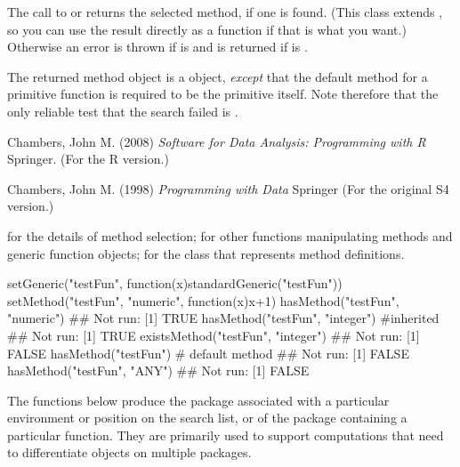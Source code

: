 %
\begin{Value}
The call to  or  returns  the selected method, if
one is found.
(This class extends , so you can use the result
directly as a function if that is what you want.)
Otherwise an error is thrown if  is   and   is returned if
 is .

The returned method object is a
 object, \emph{except} that the default method for a primitive function is required to be the primitive itself.
Note therefore that the only reliable test that the search failed is .

\end{Value}
%
\begin{References}\relax
Chambers, John M. (2008)
\emph{Software for Data Analysis: Programming with R}
Springer.  (For the R version.)

Chambers, John M. (1998)
\emph{Programming with Data}
Springer (For the original S4 version.)
\end{References}
%
\begin{SeeAlso}\relax
{} for the details of method
selection;  for other functions
manipulating methods and generic function objects;
 for the class that represents
method definitions.
\end{SeeAlso}
%
\begin{Examples}
\begin{ExampleCode}
setGeneric("testFun", function(x)standardGeneric("testFun"))
setMethod("testFun", "numeric", function(x)x+1)
hasMethod("testFun", "numeric")
## Not run: [1] TRUE
hasMethod("testFun", "integer") #inherited
## Not run: [1] TRUE
existsMethod("testFun", "integer")
## Not run: [1] FALSE
hasMethod("testFun") # default method
## Not run: [1] FALSE
hasMethod("testFun", "ANY")
## Not run: [1] FALSE

\end{ExampleCode}
\end{Examples}
%
\begin{Description}\relax
The functions below produce the package associated with a particular
environment or position on the search list, or of the package
containing a particular function.  They are primarily used to support
computations that need to differentiate objects on multiple packages.
\end{Description}
